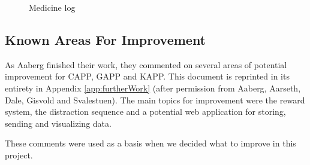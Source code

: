 \begin{figure}[H]
\begin{minipage}[b]{0.3\linewidth}
		\caption{Medicine log}
		\label{fig:medicine-log}
	\end{minipage}
\end{figure}

\subsection{Known Areas For Improvement}
\label{sec:improvements}
As Aaberg \etal{} finished their work, they commented on several areas of potential improvement for CAPP, GAPP and KAPP. This document is reprinted in its entirety in Appendix \ref{app:furtherWork} (after permission from Aaberg, Aarseth, Dale, Gisvold and Svalestuen). The main topics for improvement were the reward system, the distraction sequence and a potential web application for storing, sending and visualizing data. 


These comments were used as a basis when we decided what to improve in this project. 





